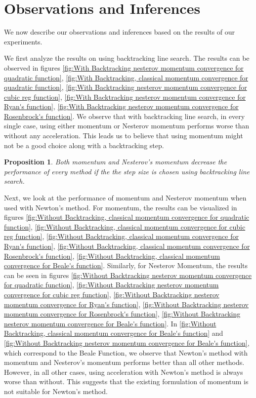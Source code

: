 \documentclass{article}
\newtheorem{prop}{Proposition}
\begin{document}
\section{Observations and Inferences}\label{inferences}
We now describe our observations and inferences based on the results of our experiments.

We first analyze the results on using backtracking line search. The results can be observed in figures \ref{fig:With Backtracking nesterov momentum convergence for quadratic function}, \ref{fig:With Backtracking, classical momentum convergence for quadratic function},
\ref{fig:With Backtracking nesterov momentum convergence for cubic reg function},
\ref{fig:With Backtracking nesterov momentum convergence for Ryan's function},
\ref{fig:With Backtracking nesterov momentum convergence for Rosenbrock's function}. We observe that with backtracking line search, in every single case, using either momentum or Nesterov momentum performs worse than without any acceleration. This leads us to believe that using momentum might not be a good choice along with a backtracking step.

\begin{prop}
	Both momentum and Nesterov's momentum decrease the performance of every method if the the step size is chosen using backtracking line search.
\end{prop}

Next, we look at the performance of momentum and Nesterov momentum when used with Newton's method. For momentum, the results can be visualized in figures \ref{fig:Without Backtracking, classical momentum convergence for quadratic function},
\ref{fig:Without Backtracking, classical momentum convergence for cubic reg function},
\ref{fig:Without Backtracking, classical momentum convergence for Ryan's function},
\ref{fig:Without Backtracking, classical momentum convergence for Rosenbrock's function},
\ref{fig:Without Backtracking, classical momentum convergence for Beale's function}. Similarly, for Nesterov Momentum, the results can be seen in figures \ref{fig:Without Backtracking nesterov momentum convergence for quadratic function},
\ref{fig:Without Backtracking nesterov momentum convergence for cubic reg function},
\ref{fig:Without Backtracking nesterov momentum convergence for Ryan's function},
\ref{fig:Without Backtracking nesterov momentum convergence for Rosenbrock's function},
\ref{fig:Without Backtracking nesterov momentum convergence for Beale's function}. In \ref{fig:Without Backtracking, classical momentum convergence for Beale's function} and \ref{fig:Without Backtracking nesterov momentum convergence for Beale's function}, which correspond to the Beale Function, we observe that Newton's method with momentum and Nesterov's momentum performs better than all other methods. However, in all other cases, using acceleration with Newton's method is always worse than without. This suggests that the existing formulation of momentum is not suitable for Newton's method.
\end{document}
